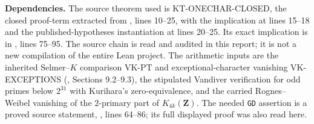 \documentclass[11pt,a4paper]{article}
\theoremstyle{definition}
\renewcommand{\paragraph}[1]{\par\smallskip\noindent\textbf{#1}\quad\ignorespaces}
\begin{document}
\paragraph{Dependencies.}
The source theorem used is KT-ONECHAR-CLOSED, the closed
proof-term extracted from
, lines 10--25,
with the  implication at lines 15--18 and
the published-hypotheses instantiation at lines 20--25.
Its exact implication is in ,
lines 75--95. The source chain is read and audited in this report;
it is not a new compilation of the entire Lean project.
The arithmetic inputs are the inherited Selmer--$K$ comparison
VK-PT and exceptional-character vanishing VK-EXCEPTIONS
(, Sections 9.2--9.3), the stipulated
Vandiver verification for odd primes below $2^{31}$ with
Kurihara's zero-equivalence, and the carried Rognes--Weibel
vanishing of the $2$-primary part of $K_{4k}(\mathbf Z)$.
The needed \texttt{GD} assertion is a proved source statement,
, lines 64--86;
its full displayed proof was also read here.
\end{document}
